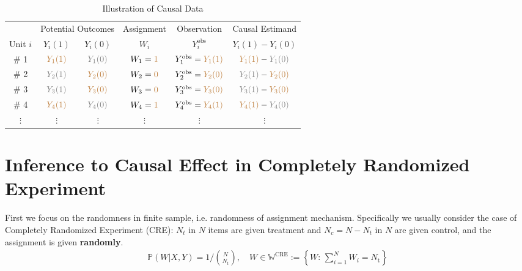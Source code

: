         \begin{table}[H]
            \centering
            \renewcommand\arraystretch{1}
            \caption{Illustration of Causal Data}
            \begin{tabular}{cccccc}
                \hline
                \hline
                &\multicolumn{2}{c}{Potential Outcomes}&Assignment&Observation&Causal Estimand\\
                \cline{2-3}
                Unit $ i $&$ Y_i(1) $&$ Y_i(0) $&$ W_i $&$ Y^\mathrm{obs}_i  $&$ Y_i(1)-Y_i(0) $\\
                \hline
                \# 1&$ \color{brown}Y_1(1) $&$ \color{gray}Y_1(0) $&$ W_1={\color{brown}1} $&$ Y^\mathrm{obs}_1=\color{brown}Y_1(1)  $&$ {\color{brown}Y_1(1)}-{\color{gray}Y_1(0)} $\\
                \# 2&$ \color{gray}Y_2(1) $&$ \color{brown}Y_2(0) $&$ W_2={\color{brown}0} $&$ Y^\mathrm{obs}_2=\color{brown}Y_2(0)  $&$ {\color{gray}Y_2(1)}-{\color{brown}Y_2(0)} $\\
                \# 3&$ \color{gray}Y_3(1) $&$ \color{brown}Y_3(0) $&$ W_3={\color{brown}0} $&$ Y^\mathrm{obs}_3=\color{brown}Y_3(0)  $&$ {\color{gray}Y_3(1)}-{\color{brown}Y_3(0)} $\\
                \# 4&$ \color{brown}Y_4(1) $&$ \color{gray}Y_4(0) $&$ W_4={\color{brown}1} $&$ Y^\mathrm{obs}_4=\color{brown}Y_4(1)  $&$ {\color{brown}Y_4(1)}-{\color{gray}Y_4(0)} $\\
                $ \vdots $&$ \vdots $&$ \vdots $&$ \vdots $&$ \vdots $&$ \vdots $\\
                \hline
                \hline
            \end{tabular}
            \label{}
        \end{table}
    

    


\section{Inference to Causal Effect in Completely Randomized Experiment}

First we focus on the randomness in finite sample, i.e. randomness of assignment mechanism. Specifically we usually consider the case of Completely Randomized Experiment (CRE): $ N_t $ in $ N $ items are given treatment and $ N_c=N-N_t $ in $ N $ are given control, and the assignment is given \textbf{randomly}. 
\begin{align}
    \mathbb{P}\left( W|X,Y \right)=1\bigg/\binom{N}{N_\mathrm{t} },\quad W\in\mathbb{W}^\mathrm{CRE}:=\left\{W:\,\sum_{i=1}^NW_i=N_\mathrm{t}\right\}
\end{align}

